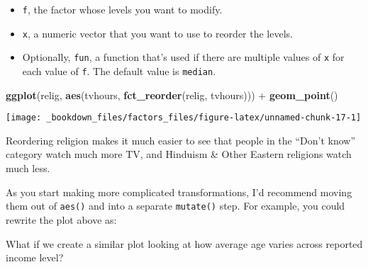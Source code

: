\documentclass[]{book}
\newenvironment{Shaded}{\begin{snugshade}}{\end{snugshade}}
\newcommand{\KeywordTok}[1]{\textcolor[rgb]{0.13,0.29,0.53}{\textbf{{#1}}}}
\newcommand{\DataTypeTok}[1]{\textcolor[rgb]{0.13,0.29,0.53}{{#1}}}
\newcommand{\StringTok}[1]{\textcolor[rgb]{0.31,0.60,0.02}{{#1}}}
\newcommand{\NormalTok}[1]{{#1}}
\providecommand{\tightlist}{%
  \setlength{\itemsep}{0pt}\setlength{\parskip}{0pt}}
\begin{document}
\begin{itemize}
\tightlist
\item
  \texttt{f}, the factor whose levels you want to modify.
\item
  \texttt{x}, a numeric vector that you want to use to reorder the
  levels.
\item
  Optionally, \texttt{fun}, a function that's used if there are multiple
  values of \texttt{x} for each value of \texttt{f}. The default value
  is \texttt{median}.
\end{itemize}

\begin{Shaded}
\begin{Highlighting}[]
\KeywordTok{ggplot}\NormalTok{(relig, }\KeywordTok{aes}\NormalTok{(tvhours, }\KeywordTok{fct_reorder}\NormalTok{(relig, tvhours))) +}
\StringTok{  }\KeywordTok{geom_point}\NormalTok{()}
\end{Highlighting}
\end{Shaded}

\begin{center}\texttt{[image: \_bookdown\_files/factors\_files/figure-latex/unnamed-chunk-17-1]} \end{center}

Reordering religion makes it much easier to see that people in the
``Don't know'' category watch much more TV, and Hinduism \& Other
Eastern religions watch much less.

As you start making more complicated transformations, I'd recommend
moving them out of \texttt{aes()} and into a separate \texttt{mutate()}
step. For example, you could rewrite the plot above as:

\begin{Shaded}
\end{Shaded}

What if we create a similar plot looking at how average age varies
across reported income level?
\end{document}
